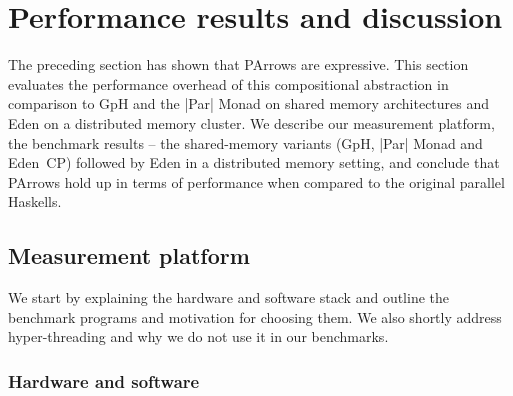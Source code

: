 
%
\section{Performance results and discussion}
\label{sec:benchmarks}

The preceding section has shown that PArrows are expressive. This section evaluates the performance overhead of this compositional abstraction in comparison to  GpH and the |Par| Monad on shared memory architectures and Eden on  a distributed memory cluster.
We describe our measurement platform, the benchmark results -- the shared-memory variants (GpH, |Par| Monad and Eden~CP) followed by Eden in a distributed memory setting, and conclude that PArrows hold up in terms of performance when compared to the original parallel Haskells.


\newcommand{\rmtest}{Rabin--Miller test\xspace}
\newcommand{\sudokutest}{Sudoku\xspace}
\newcommand{\jacobitest}{Jacobi sum test\xspace}
\newcommand{\torustest}{Gentleman\xspace}
\newlength{\plotwidthSMP}
\setlength{\plotwidthSMP}{0.39\textwidth}
\newlength{\plotwidthDist}
\setlength{\plotwidthDist}{0.6\textwidth}

\newcommand{\benchmarkDir}{benchmarks}

\newcommand{\speedupplot}[8]{
\begin{tikzpicture}
\begin{axis}[title={#1},
title style={align=center},
scale only axis, width=#7,
xlabel=Threads,
xtick distance=#4,
ytick distance=#4,
ylabel=Speedup,
ylabel near ticks,
grid=major,
legend entries={linear, #2},
legend style={at={(0.01,0.99)},anchor=north west},
max space between ticks=50pt,
grid style={line width=.1pt, draw=gray!10},
major grid style={line width=.2pt,draw=gray!50},
ymin=-1,
xmin=-1,
ymax=#8,
xmax=#6]
\addplot [domain=0:#3, no markers,dotted,thick]{x};
#5
\end{axis}
\end{tikzpicture}
}

\subsection{Measurement platform}
We start by explaining the hardware and software stack and outline the benchmark programs and motivation for choosing them. We also shortly address hyper-threading and why we do not use it in our benchmarks.

\subsubsection{Hardware and software}

